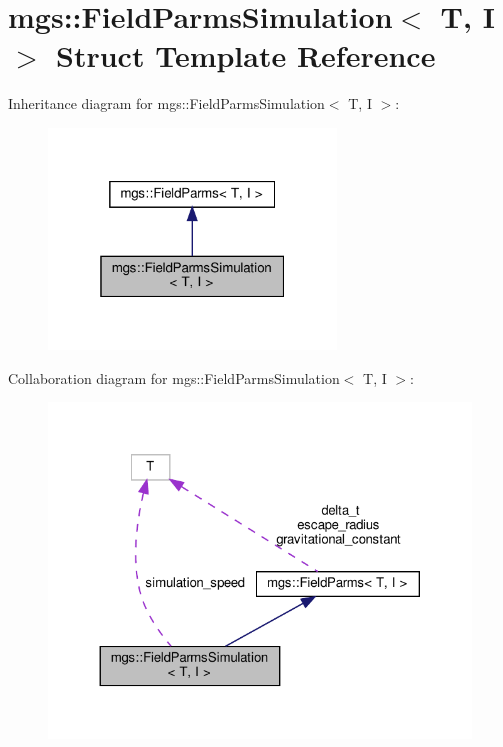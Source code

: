 \hypertarget{structmgs_1_1FieldParmsSimulation}{}\section{mgs\+:\+:Field\+Parms\+Simulation$<$ T, I $>$ Struct Template Reference}
\label{structmgs_1_1FieldParmsSimulation}


Inheritance diagram for mgs\+:\+:Field\+Parms\+Simulation$<$ T, I $>$\+:
\nopagebreak
\begin{figure}[H]
\begin{center}
\leavevmode
\includegraphics[width=217pt]{structmgs_1_1FieldParmsSimulation__inherit__graph}
\end{center}
\end{figure}


Collaboration diagram for mgs\+:\+:Field\+Parms\+Simulation$<$ T, I $>$\+:
\nopagebreak
\begin{figure}[H]
\begin{center}
\leavevmode
\includegraphics[width=324pt]{structmgs_1_1FieldParmsSimulation__coll__graph}
\end{center}
\end{figure}
